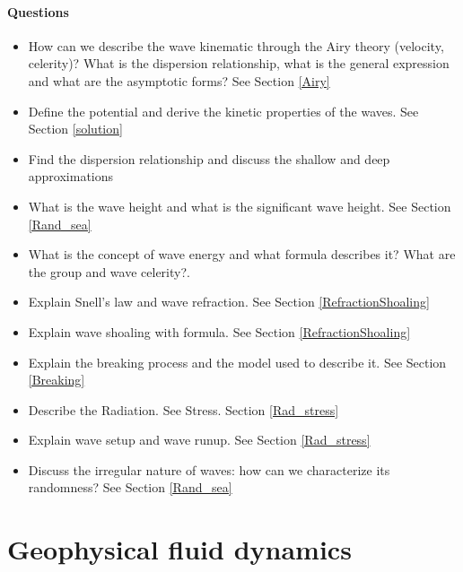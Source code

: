 \subsubsection*{Questions}
\begin{itemize}
\item How can we describe the wave kinematic through the Airy theory (velocity, celerity)? What is the dispersion relationship, what is the general expression and what are the asymptotic forms? See Section \ref{Airy}
\item Define the potential and derive the kinetic properties of the waves. See Section \ref{solution}
\item Find the dispersion relationship and discuss the shallow and deep approximations
\item What is the wave height and what is the significant wave height. See Section \ref{Rand_sea}
\item What is the concept of wave energy and what formula describes it? What are the group and wave celerity?. %
\item Explain Snell’s law and wave refraction. See Section \ref{RefractionShoaling}
\item Explain wave shoaling with formula. See Section \ref{RefractionShoaling}
\item Explain the breaking process and the model used to describe it. See Section \ref{Breaking}
\item Describe the Radiation. See Stress. Section \ref{Rad_stress}
\item Explain wave setup and wave runup. See Section \ref{Rad_stress}
\item Discuss the irregular nature of waves: how can we characterize its randomness? See Section \ref{Rand_sea}
\end{itemize}
\chapter{Geophysical fluid dynamics}
